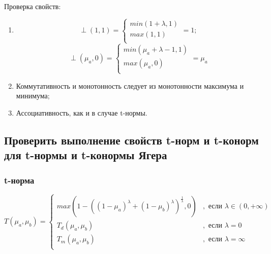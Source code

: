 \documentclass[12pt]{article}
\begin{document}
Проверка свойств:
\begin{enumerate}
    \item $$
      \perp(1, 1) = 
      \begin{cases}
         min(1+\lambda, 1) \\
         max(1, 1) \\ 
      \end{cases} = 1;
      $$
      $$ 
      \perp(\mu_a, 0) = 
      \begin{cases}
         min(\mu_a+\lambda-1, 1) \\
         max(\mu_a, 0) \\ 
      \end{cases} = \mu_a
      $$
  \item Коммутативность и монотонность следует из монотонности максимума и минимума;
  \item Ассоциативность, как и в случае t-нормы.
\end{enumerate}

\subsection{Проверить выполнение свойств t-норм и t-конорм для t-нормы и t-конормы Ягера}

\subsubsection{t-норма}

$$
   T(\mu_a, \mu_b) =
   \begin{cases}
      max\left(1-\left((1-\mu_a)^\lambda+(1-\mu_b)^\lambda\right)^{\frac{1}{\lambda}}, 0\right) &, \text{ если }\lambda\in(0, +\infty)\\
      T_d(\mu_a, \mu_b) &, \text{ если }\lambda=0\\
      T_m(\mu_a, \mu_b) &, \text{ если }\lambda=\infty\\
   \end{cases}
$$
\end{document}
